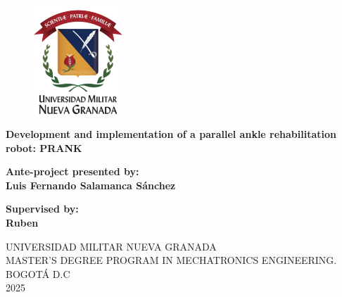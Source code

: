\graphicspath{{images/}}
\begin{titlepage}

    \begin{center}
        \hspace*{1cm}
        
        \begin{figure}[H]  
         \centering
         \includegraphics[width=0.3\textwidth, height=0.3\textwidth]{logo-umng.png} 
        \end{figure}            
        
        \large
        \textbf{Development and implementation of a parallel ankle rehabilitation robot: PRANK } 

%


        \vspace{3cm}
        
        \large
        \textbf{Ante-project presented by: \\Luis Fernando Salamanca Sánchez}
        
        \vspace{2cm}
        \vspace{2cm}
        
        \textbf{Supervised by:}\\
        \textbf{Ruben }\\
        
        \vfill
        
        
        
        
        UNIVERSIDAD MILITAR NUEVA GRANADA \\
        MASTER'S DEGREE PROGRAM IN MECHATRONICS ENGINEERING. \\
        BOGOTÁ D.C \\
        2025
    \end{center}
\end{titlepage}